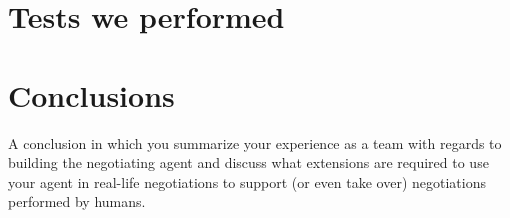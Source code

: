 \documentclass[11pt,a4paper]{report}
\begin{document}
%
%




\newpage





\section*{Tests we performed}


\section*{Conclusions}

A conclusion in which you summarize your experience as a team with regards to building the
negotiating agent and discuss what extensions are required to use your agent in real-life negotiations to support (or even take over) negotiations performed by humans.
\end{document}

